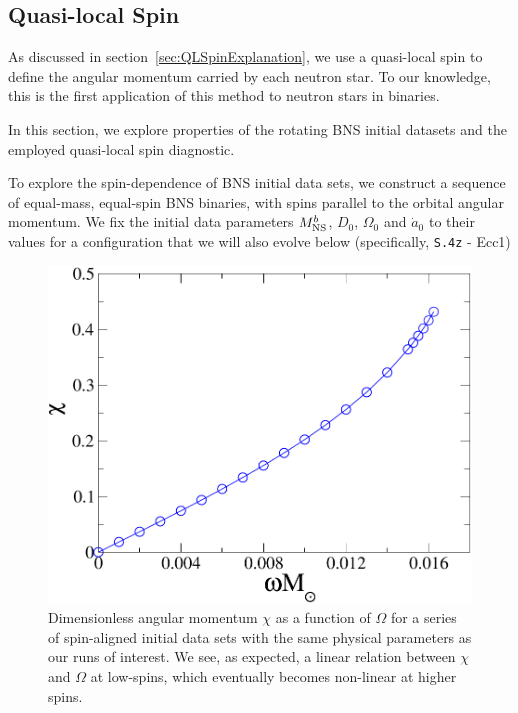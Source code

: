 {\subsection{Quasi-local Spin}
\label{sec:QLSpinProperties}

As discussed in section~\ref{sec:QLSpinExplanation}, we use a
quasi-local spin to define the angular momentum carried by each
neutron star.  To our knowledge, this is the first application of this
method to neutron stars in binaries. 

In this section, we explore properties of the rotating BNS initial
datasets and the employed quasi-local spin diagnostic.


To explore the spin-dependence of BNS initial data sets, we
construct a sequence of equal-mass, equal-spin BNS binaries, with
spins parallel to the orbital angular momentum.  We fix the initial
data parameters $M^b_{\rm NS}$, $D_0$, $\Omega_0$ and $\dot{a}_0$ to
their values for a configuration that we will also evolve below (specifically,  {\tt S.4z} - Ecc1)


\begin{figure}
\includegraphics[width=0.95\columnwidth]{chap2/ChiVOmega}
\caption[Dimensionless angular momentum as a function of $\Omega$.]{{\label{fig:ChiVOmega}}Dimensionless angular momentum $\chi$ as a function of $\Omega$ for
  a series of spin-aligned initial data sets with the same physical
  parameters as our runs of interest. We see, as expected, a linear
  relation between $\chi$ and $\Omega$ at low-spins, which eventually
  becomes non-linear at higher spins. }
\end{figure}


}
